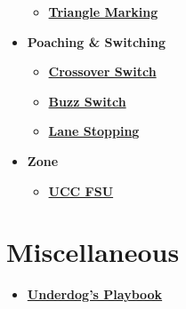 \begin{itemize}
\begin{itemize}
        \item \textcolor{blue}{\textbf{\href{https://www.youtube.com/watch?v=JWsvaXhsnJM}{Triangle Marking}}}
    \end{itemize}
    \item \textbf{Poaching \& Switching}
    \begin{itemize}
        \item \textcolor{blue}{\textbf{\href{https://www.youtube.com/watch?v=04VmuAvbCYM}{Crossover Switch}}}
        \item \textcolor{blue}{\textbf{\href{https://gfycat.com/threadbarerepentantfirebelliedtoad-handler-switching-ultimate-sport}{Buzz Switch}}}
        \item \textcolor{blue}{\textbf{\href{https://www.youtube.com/watch?v=2vIG0XL4mps}{Lane Stopping}}}
    \end{itemize}
    \item \textbf{Zone}
    \begin{itemize}
        \item \textcolor{blue}{\textbf{\href{https://drive.google.com/file/d/0B709W22N3JYUbl9RUnZOSi1qY2RMbE9EUjVxeDZEeEhrdTMw/view?usp=sharing&resourcekey=0-JwodgQXD_up2TC-5E_ArBQ}{UCC FSU}}}
    \end{itemize}
\end{itemize}

\section{Miscellaneous}
\begin{itemize}
    \item \textcolor{blue}{\textbf{\href{https://ultiworld.com/2016/01/12/the-playbook-for-underdogs/
}{Underdog's Playbook}}}
\end{itemize}